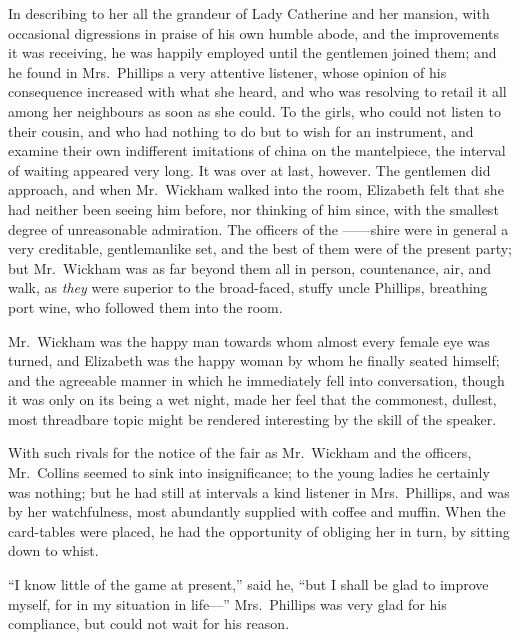 \documentclass[12pt,english]{book}
\begin{document}
In describing to her all the grandeur of Lady Catherine and her mansion,
with occasional digressions in praise of his own humble abode, and
the improvements it was receiving, he was happily employed until the
gentlemen joined them; and he found in Mrs.\ Phillips a very attentive
listener, whose opinion of his consequence increased with what she
heard, and who was resolving to retail it all among her neighbours
as soon as she could. To the girls, who could not listen to their
cousin, and who had nothing to do but to wish for an instrument, and
examine their own indifferent imitations of china on the mantelpiece,
the interval of waiting appeared very long. It was over at last, however.
The gentlemen did approach, and when Mr.\ Wickham walked into the
room, Elizabeth felt that she had neither been seeing him before,
nor thinking of him since, with the smallest degree of unreasonable
admiration. The officers of the \mbox{------shire} were in general
a very creditable, gentlemanlike set, and the best of them were of
the present party; but Mr.\ Wickham was as far beyond them all in
person, countenance, air, and walk, as \textit{they} were superior
to the broad-faced, stuffy uncle Phillips, breathing port wine, who
followed them into the room.

Mr.\ Wickham was the happy man towards whom almost every female eye
was turned, and Elizabeth was the happy woman by whom he finally seated
himself; and the agreeable manner in which he immediately fell into
conversation, though it was only on its being a wet night, made her
feel that the commonest, dullest, most threadbare topic might be rendered
interesting by the skill of the speaker.

With such rivals for the notice of the fair as Mr.\ Wickham and the
officers, Mr.\ Collins seemed to sink into insignificance; to the
young ladies he certainly was nothing; but he had still at intervals
a kind listener in Mrs.\ Phillips, and was by her watchfulness, most
abundantly supplied with coffee and muffin. When the card-tables were
placed, he had the opportunity of obliging her in turn, by sitting
down to whist.

{}``I know little of the game at present,'' said he, {}``but I
shall be glad to improve myself, for in my situation in life\mbox{---}''
Mrs.\ Phillips was very glad for his compliance, but could not wait
for his reason.
\end{document}
